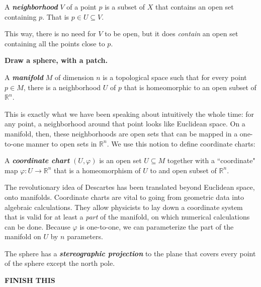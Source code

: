 	\begin{defn}[Neighborhood]\label{def:Neighborhood}
		A \textbf{\emph{neighborhood}} $V$ of a point $p$ is a subset of $X$ that contains an open set containing $p$. That is $p \in U \subseteq V$.
	\end{defn}
	
	This way, there is no need for $V$ to be open, but it does \emph{contain} an open set containing all the points close to $p$.
	
	\textbf{Draw a sphere, with a patch.}
	
	\begin{defn}\label{def:Manifold}
		A \textbf{\emph{manifold}} $M$ of dimension $n$ is a topological space such that for every point $p \in M$, there is a neighborhood $U$ of $p$ that is homeomorphic to an open  subset of $\mathbb{R}^n$.
	\end{defn}
	
	This is exactly what we have been speaking about intuitively the whole time: for any point, a neighborhood around that point looks like Euclidean space. On a manifold, then, these neighborhoods are open sets that can be mapped in a one-to-one manner to open sets in $\mathbb{R}^n$. We use this notion to define coordinate charts: 
	
	\begin{defn}\label{def:coordinate_charts}
		A \textbf{\emph{coordinate chart}} $(U, \varphi)$ is an open set $U \subseteq M$ together with a ``coordinate" map $\varphi: U \rightarrow \mathbb{R}^n$ that is a homeomorphism of $U$ to and open subset of $\mathbb{R}^n$.
	\end{defn}
	
	The revolutionary idea of Descartes has been translated beyond Euclidean space, onto manifolds. Coordinate charts are vital to going from geometric data into algebraic calculations. They allow physicists to lay down a coordinate system that is valid for at least a \emph{part} of the manifold, on which numerical calculations can be done. Because $\varphi$ is one-to-one, we can parameterize the part of the manifold on $U$ by $n$ parameters.
	
	\begin{example}
		The sphere has a \textbf{\emph{stereographic projection}} to the plane that covers every point of the sphere except the north pole. 
	\end{example}
	\textbf{FINISH THIS}
	
